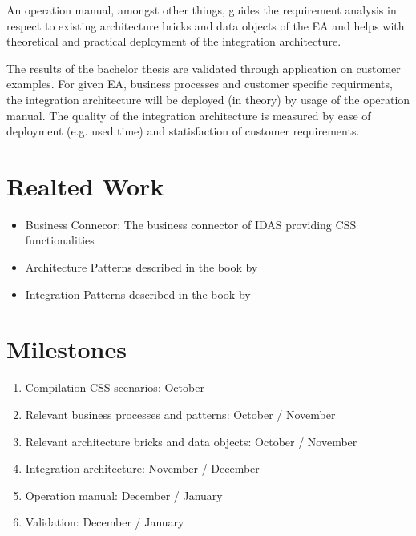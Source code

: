 \documentclass{article}
\begin{document}
An operation manual, 
amongst other things, guides the requirement analysis in respect to existing architecture bricks and data 
objects of the EA and helps with theoretical and practical deployment of the integration architecture.

The results of the bachelor thesis are validated through application on customer examples. For given 
EA, business processes and customer specific requirments, the integration architecture will be 
deployed (in theory) by usage of the operation manual.
The quality of the integration architecture is measured by ease of deployment (e.g. used time) and 
statisfaction of customer requirements.

\section{Realted Work}

\begin{itemize}
    \item Business Connecor: The business connector of IDAS providing CSS functionalities
    \item Architecture Patterns described in the book by \cite{architecturePatterns}
    \item Integration Patterns described in the book by \cite{integrationPatterns}
\end{itemize}

\section{Milestones}

\begin{enumerate}
    \item Compilation CSS scenarios: October
    \item Relevant business processes and patterns: October / November
    \item Relevant architecture bricks and data objects: October / November
    \item Integration architecture: November / December
    \item Operation manual: December / January
    \item Validation: December / January
\end{enumerate}

\printbibliography
\end{document}
